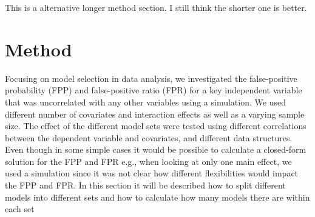 This is a alternative longer method section. 
I still think the shorter one is better. 

\section{Method}
Focusing on model selection in data analysis, we investigated the false-positive probability (FPP) and false-positive ratio (FPR) for a key independent variable that was uncorrelated with any other variables using a simulation. We used different number of covariates and interaction effects as well as a varying sample size. The effect of the different model sets were tested using different correlations between the dependent variable and covariates, and different data structures. Even though in some simple cases it would be possible to calculate a closed-form solution for the FPP and FPR e.g., when looking at only one main effect, we used a simulation since it was not clear how different flexibilities would impact the FPP and FPR. In this section it will be described how to split different models into different sets and how to calculate how many models there are within each set\\

